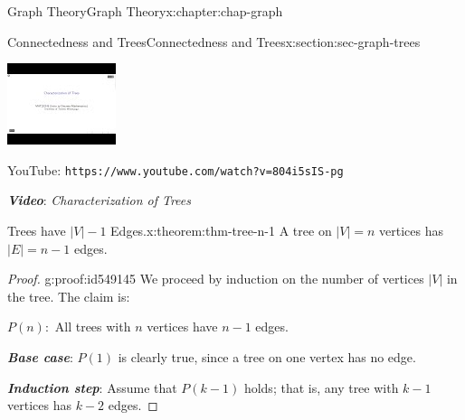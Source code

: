 \documentclass[oneside,10pt,]{book}
\newcommand{\mono}[1]{\texttt{#1}}
\newcommand{\alert}[1]{\textbf{\textit{#1}}}
\numberwithin{equation}{section}
\newlength{\qrsize}
\newlength{\previewwidth}
\begin{document}
\begin{chapterptx}{Graph Theory}{}{Graph Theory}{}{}{x:chapter:chap-graph}
\begin{sectionptx}{Connectedness and Trees}{}{Connectedness and Trees}{}{}{x:section:sec-graph-trees}
\begin{sidebyside}{1}{0}{0}{0}
\begin{sbspanel}{1}
\begin{tcbraster}[raster columns=2, raster column skip=1pt, raster halign=center, raster force size=false, raster left skip=0pt, raster right skip=0pt]
\begin{tcolorbox}[previewstyle, width=\previewwidth]
\includegraphics[width=0.80\linewidth,height=\qrsize,keepaspectratio]{images/video-char-trees.jpg}%
\end{tcolorbox}%
\begin{tcolorbox}[qrstyle]%
{\hypersetup{urlcolor=black}}%
\end{tcolorbox}%
\begin{tcolorbox}[captionstyle]%
\small YouTube: \mono{https://www.youtube.com/watch?v=804i5sIS-pg}\end{tcolorbox}%
\end{tcbraster}%
\end{sbspanel}%
\end{sidebyside}%
\par
\alert{Video}: \emph{Characterization of Trees}%
\begin{theorem}{Trees have \(|V|-1\) Edges.}{}{x:theorem:thm-tree-n-1}%
A tree on \(|V| = n\) vertices has \(|E| = n-1\) edges.%
\end{theorem}
\begin{proof}{}{g:proof:id549145}
We proceed by induction on the number of vertices \(|V|\) in the tree. The claim is:%
\begin{sidebyside}{1}{0.125}{0.125}{0}%
\begin{sbspanel}{0.75}%
\(P(n):\) All trees with \(n\) vertices have \(n-1\) edges.%
\end{sbspanel}%
\end{sidebyside}%
\par
\alert{Base case}: \(P(1)\) is clearly true, since a tree on one vertex has no edge.%
\par
\alert{Induction step}: Assume that \(P(k-1)\) holds; that is, any tree with \(k-1\) vertices has \(k-2\) edges.%
\par

\end{proof}
\end{sectionptx}
\end{chapterptx}
\end{document}
